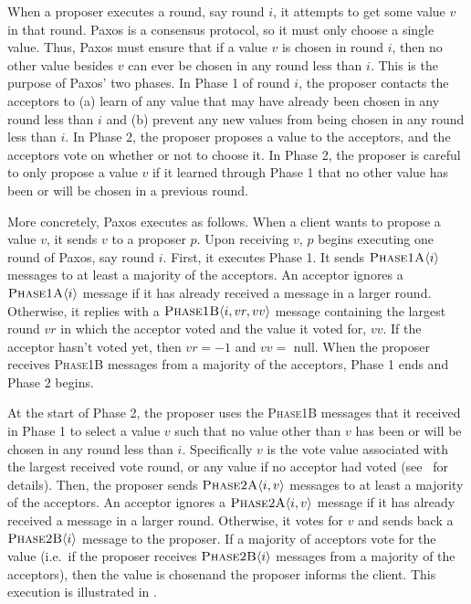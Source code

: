 {}

When a proposer executes a round, say round $i$, it attempts to get some value
%
$v$  in that round.  Paxos is a
consensus protocol, so it must only choose a single value. Thus, Paxos must
ensure that if a value $v$ is chosen in round $i$, then no other value besides
$v$ can ever be chosen in any round less than $i$. This is the purpose of
Paxos' two phases. In Phase 1 of round $i$, the proposer contacts the acceptors
to (a) learn of any value that may have already been chosen in any round less
than $i$ and (b) prevent any new values from being chosen in any round less
than $i$. In Phase 2, the proposer proposes a value to the acceptors, and the
acceptors vote on whether or not to choose it.  In Phase 2, the proposer is
careful to only propose a value $v$ if it learned through Phase 1 that no other
value has been or will be chosen in a previous round.

More concretely, Paxos executes as follows. When a client wants to propose a
value $v$, it sends $v$ to a proposer $p$. Upon receiving $v$, $p$ begins
executing one round of Paxos, say round $i$. First, it executes Phase 1. It
sends $\textsc{Phase1A}\langle{i}\rangle$ messages to at least a majority of the acceptors. An
acceptor ignores a $\textsc{Phase1A}\langle{i}\rangle$ message if it has already received a message
in a larger round. Otherwise, it replies with a $\textsc{Phase1B}\langle{i, vr, vv}\rangle$ message
containing the largest round $vr$ in which the acceptor voted and the value it
voted for, $vv$. If the acceptor hasn't voted yet, then $vr = -1$ and $vv = $
\textsf{null}. When the proposer receives \textsc{Phase1B} messages from a
majority of the acceptors, Phase 1 ends and Phase 2 begins.

At the start of Phase 2, the proposer uses the \textsc{Phase1B} messages that
it received in Phase 1 to select a value $v$ such that no value other than $v$
has been or will be chosen in any round less than $i$. Specifically $v$ is the
vote value associated with the largest received vote round, or any value if no
acceptor had voted (see~\cite{lamport2001paxos} for details). Then, the
proposer sends $\textsc{Phase2A}\langle{i, v}\rangle$ messages to at least a majority of the
acceptors. An acceptor ignores a $\textsc{Phase2A}\langle{i, v}\rangle$ message if it has already
received a message in a larger round. Otherwise, it votes for $v$ and sends
back a $\textsc{Phase2B}\langle{i}\rangle$ message to the proposer. If a majority of acceptors vote
for the value (i.e.\ if the proposer receives $\textsc{Phase2B}\langle{i}\rangle$ messages from a
%
majority of the acceptors), then the value is chosenand the proposer informs the
client. This execution is illustrated in .


